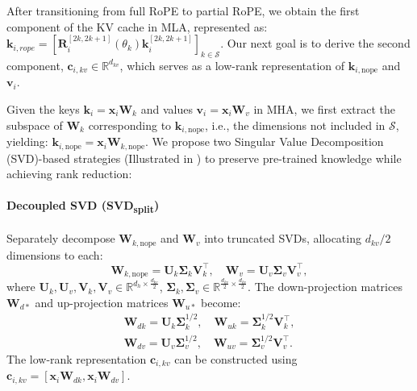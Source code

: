 

After transitioning from full RoPE to partial RoPE, we obtain the first component of the KV cache in MLA, represented as: \(\bm{k}_{i, rope} = \left[\bm{R}_i^{[2k,2k+1]}(\theta_k)\bm{k}_i^{[2k,2k+1]}\right]_{k \in \mathcal{S}}\). 
Our next goal is to derive the second component, \(\bm{c}_{i,kv} \in \mathbb{R}^{d_{kv}}\), which serves as a low-rank representation of \(\bm{k}_{i,\text{nope}}\) and \(\bm{v}_i\).


Given the keys $\bm{k}_i = \bm{x}_i \bm{W}_k$ and values $\bm{v}_i = \bm{x}_i \bm{W}_v$ in MHA,
we first extract the subspace of $\bm{W}_k$ corresponding to \(\bm{k}_{i,\text{nope}}\), i.e., the dimensions not included in \(\mathcal{S}\), yielding: $\bm{k}_{i,\text{nope}} = \bm{x}_i \bm{W}_{k,\text{nope}}$.
We propose two Singular Value Decomposition (SVD)-based strategies (Illustrated in ) to preserve pre-trained knowledge while achieving rank reduction:


\paragraph{Decoupled SVD (SVD\textsubscript{split})}  
Separately decompose \(\bm{W}_{k,\text{nope}}\) and \(\bm{W}_v\) into truncated SVDs, allocating \(d_{kv}/2\) dimensions to each:  
\[
\bm{W}_{k,\text{nope}} = \bm{U}_k \bm{\Sigma}_k \bm{V}_k^\top, \quad \bm{W}_v = \bm{U}_v \bm{\Sigma}_v \bm{V}_v^\top,
\]  
where \(\bm{U}_k, \bm{U}_v,\bm{V}_{k},\bm{V}_{v}\in \mathbb{R}^{d_h \times \frac{d_{kv}}{2}}\), \(\bm{\Sigma}_k, \bm{\Sigma}_v \in \mathbb{R}^{\frac{d_{kv}}{2} \times \frac{d_{kv}}{2}}\). The down-projection matrices $\bm{W}_{d*}$ and up-projection matrices $\bm{W}_{u*}$ become:  
\begin{gather*}
\bm{W}_{dk} = \bm{U}_k \bm{\Sigma}_k^{1/2}, \quad \bm{W}_{uk} = \bm{\Sigma}_k^{1/2} \bm{V}_k^\top, \\ 
\bm{W}_{dv} = \bm{U}_v \bm{\Sigma}_v^{1/2}, \quad \bm{W}_{uv} = \bm{\Sigma}_v^{1/2} \bm{V}_v^\top.
\end{gather*}
The low-rank representation \( \bm{c}_{i, kv} \) can be constructed using $\bm{c}_{i,kv} = \left[ \bm{x}_i \bm{W}_{dk}, \bm{x}_i \bm{W}_{dv} \right]$.


